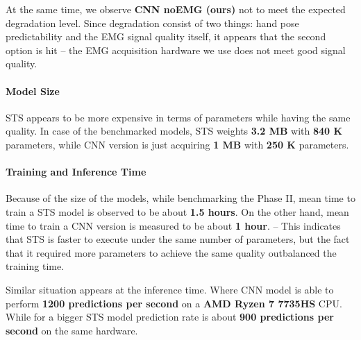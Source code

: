 At the same time, we observe \textbf{CNN noEMG (ours)} not to meet the expected degradation level. Since degradation consist of two things: hand pose predictability and the EMG signal quality itself, it appears that the second option is hit -- the EMG acquisition hardware we use does not meet good signal quality.

\paragraph{Model Size}
STS appears to be more expensive in terms of parameters while having the same quality. In case of the benchmarked models, STS weights \textbf{3.2 MB} with \textbf{840 K} parameters, while CNN version is just acquiring \textbf{1 MB} with \textbf{250 K} parameters.

\paragraph{Training and Inference Time}
Because of the size of the models, while benchmarking the Phase II, mean time to train a STS model is observed to be about \textbf{1.5 hours}. On the other hand, mean time to train a CNN version is measured to be about \textbf{1 hour}. -- This indicates that STS is faster to execute under the same number of parameters, but the fact that it required more parameters to achieve the same quality outbalanced the training time.

Similar situation appears at the inference time. Where CNN model is able to perform \textbf{1200 predictions per second} on a \textbf{AMD Ryzen 7 7735HS} CPU. While for a bigger STS model prediction rate is about \textbf{900 predictions per second} on the same hardware.